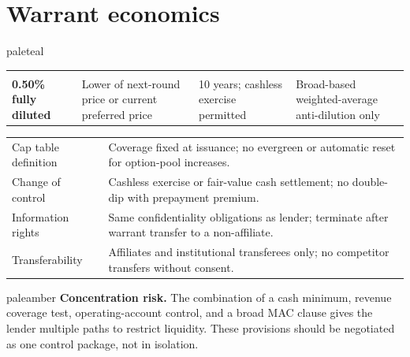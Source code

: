 \section{Warrant economics}

\begin{callout}{paleteal}
  \begin{tabularx}{\textwidth}{@{}Y Y Y Y@{}}
     &  &  &  \\
    \textbf{0.50\% fully diluted} & Lower of next-round price or current preferred price & 10 years; cashless exercise permitted & Broad-based weighted-average anti-dilution only \\
  \end{tabularx}
\end{callout}

\begin{tabularx}{\textwidth}{@{}L{0.26\textwidth}Y@{}}
\toprule
{} &  \\
\midrule
Cap table definition & Coverage fixed at issuance; no evergreen or automatic reset for option-pool increases. \\
Change of control & Cashless exercise or fair-value cash settlement; no double-dip with prepayment premium. \\
Information rights & Same confidentiality obligations as lender; terminate after warrant transfer to a non-affiliate. \\
Transferability & Affiliates and institutional transferees only; no competitor transfers without consent. \\
\bottomrule
\end{tabularx}

\begin{callout}{paleamber}
  \textcolor{amber}{\textbf{Concentration risk.}} The combination of a cash minimum, revenue coverage test, operating-account control, and a broad MAC clause gives the lender multiple paths to restrict liquidity. These provisions should be negotiated as one control package, not in isolation.
\end{callout}

\newpage

